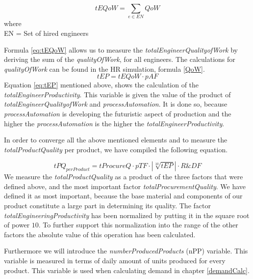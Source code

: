 \begin{center}
\begin{equation}
tEQoW=\sum_{e \in EN}{QoW}
\label{eq:tEQoW}
\end{equation}
where \\
\gls{EN} = Set of hired engineers
\end{center}
Formula \ref{eq:tEQoW} allows us to measure the \textit{totalEngineerQualityofWork} by deriving the sum of the \textit{qualityOfWork}, for all engineers. The calculations for \textit{qualityOfWork} can be found in the HR simulation, formula \ref{QoW}.
\begin{equation}
tEP=tEQoW \cdot pAF
\label{eq:tEP}
\end{equation}
Equation \ref{eq:tEP} mentioned above, shows the calculation of the \textit{totalEngineerProductivity}. This variable is given the value of the product of \textit{totalEngineerQualityofWork} and \textit{processAutomation}. It is done so, because \textit{processAutomation} is developing the futuristic  aspect of production and the higher the \textit{processAutomation} is the higher the \textit{totalEngineerProductivity}. 

In order to converge all the above mentioned elements and to measure the \textit{totalProductQuality} per product, we have compiled the following equation. 

\begin{equation}
tPQ_{perProduct} = tProcureQ \cdot pTF \cdot |\sqrt[10]{tEP}| \cdot  R\&DF
\label{eq:PQ}
\end{equation}
 We measure the \textit{totalProductQuality} as a product of the three factors that were defined above, and the most important factor \textit{totalProcurementQuality}. We have defined it as most important, because the base material and components of our product constitute a large part in determining its quality.
 The factor \textit{totalEngineeringProductivity}
 has been normalized by putting it in the square root of power $10$. 
 To further support this normalization into the range of the other factors the absolute value of this operation has been calculated.
 
 Furthermore we will introduce the \textit{numberProducedProducts} (\gls{nPP}) variable. This variable is measured in terms of daily amount of units produced for every product. This variable is used when calculating demand in chapter \ref{demandCalc}. %
 
